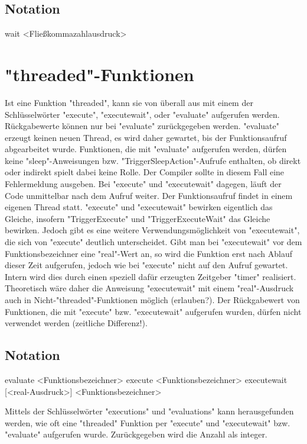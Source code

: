 \subsection{Notation}
wait <Fließkommazahlausdruck>

\section{"threaded"-Funktionen}
Ist eine Funktion "threaded", kann sie von überall aus mit einem der Schlüsselwörter "execute", "executewait", oder "evaluate" aufgerufen werden.
Rückgabewerte können nur bei "evaluate" zurückgegeben werden.
"evaluate" erzeugt keinen neuen Thread, es wird daher gewartet, bis der Funktionsaufruf abgearbeitet wurde. Funktionen, die mit
"evaluate" aufgerufen werden, dürfen keine "sleep"-Anweisungen bzw. "TriggerSleepAction"-Aufrufe enthalten, ob direkt oder indirekt spielt dabei keine Rolle.
Der Compiler sollte in diesem Fall eine Fehlermeldung ausgeben.
Bei "execute" und "executewait" dagegen, läuft der Code unmittelbar nach dem Aufruf weiter. Der Funktionsaufruf findet in einem eigenen
Thread statt.
"execute" und "executewait" bewirken eigentlich das Gleiche, insofern "TriggerExecute" und "TriggerExecuteWait" das Gleiche bewirken.
Jedoch gibt es eine weitere Verwendungsmöglichkeit von "executewait", die sich von "execute" deutlich unterscheidet.
Gibt man bei "executewait" vor dem Funktionsbezeichner eine "real"-Wert an, so wird die Funktion erst nach Ablauf dieser Zeit
aufgerufen, jedoch wie bei "execute" nicht auf den Aufruf gewartet.
Intern wird dies durch einen speziell dafür erzeugten Zeitgeber "timer" realisiert. Theoretisch wäre daher die Anweisung "executewait" mit einem
"real"-Ausdruck auch in Nicht-"threaded"-Funktionen möglich (erlauben?).
Der Rückgabewert von Funktionen, die mit "execute" bzw. "executewait" aufgerufen wurden, dürfen nicht verwendet werden (zeitliche Differenz!).

\subsection{Notation}
evaluate <Funktionsbezeichner>
execute <Funktionsbezeichner>
executewait [<real-Ausdruck>] <Funktionsbezeichner>

Mittels der Schlüsselwörter "executions" und "evaluations" kann herausgefunden werden, wie oft eine "threaded" Funktion per "execute" und "executewait"
bzw. "evaluate" aufgerufen wurde.
Zurückgegeben wird die Anzahl als integer.

